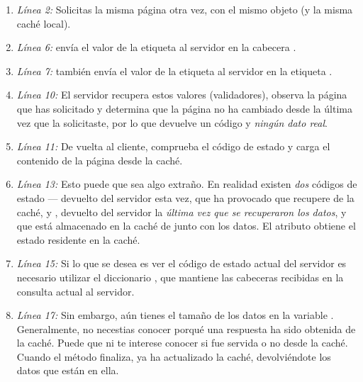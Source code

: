 \begin{enumerate}

\item \emph{Línea 2:} Solicitas la misma página otra vez, con el mismo objeto  (y la misma caché local).

\item \emph{Línea 6:}  envía el valor de la etiqueta  al servidor en la cabecera .

\item \emph{Línea 7:}  también envía el valor de la etiqueta  al servidor en la etiqueta .

\item \emph{Línea 10:} El servidor recupera estos valores (validadores), observa la página que has solicitado y determina que la página no ha cambiado desde la última vez que la solicitaste, por lo que devuelve un código  y \emph{ningún dato real}.

\item \emph{Línea 11:} De vuelta al cliente,  comprueba el código de estado  y carga el contenido de la página desde la caché.

\item \emph{Línea 13:} Esto puede que sea algo extraño. En realidad existen \emph{dos} códigos de estado ---  devuelto del servidor esta vez, que ha provocado que  recupere de la caché, y , devuelto del servidor la \emph{última vez que se recuperaron los datos}, y que está almacenado en la caché de  junto con los datos. El atributo  obtiene el estado residente en la caché.

\item \emph{Línea 15:} Si lo que se desea es ver el código de estado actual del servidor es necesario utilizar el  diccionario , que mantiene las cabeceras recibidas en la consulta actual al servidor.

\item \emph{Línea 17:} Sin embargo, aún tienes el tamaño de los datos en la variable . Generalmente, no necestias conocer porqué una respuesta ha sido obtenida de la caché. Puede que ni te interese conocer si fue servida o no desde la caché. Cuando el método  finaliza,  ya ha actualizado la caché, devolviéndote los datos que están en ella.

\end{enumerate}

